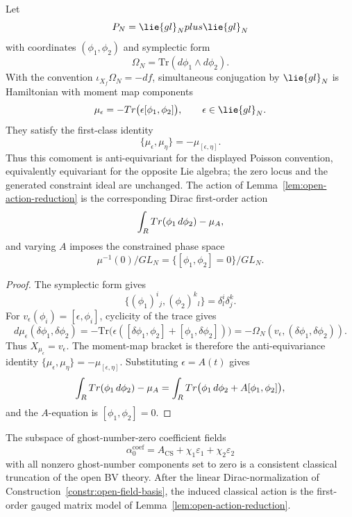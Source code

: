 \documentclass[11pt]{memoir}
\begin{document}
\begin{lem}\label{lem:dirac-probe-reduction}
  Let
  $$\mathcal P_N=\lie{gl}_N\oplus\lie{gl}_N$$
  with coordinates $(\phi_1,\phi_2)$ and symplectic form
  $$\Omega_N=\mathrm{Tr}(d\phi_1\wedge d\phi_2).$$
  With the convention $\iota_{X_f}\Omega_N=-df$, simultaneous conjugation by
  $\lie{gl}_N$ is Hamiltonian with moment map components
  $$\mu_\epsilon=-\mathrm{Tr}\bigl(\epsilon[\phi_1,\phi_2]\bigr),
    \qquad \epsilon\in\lie{gl}_N.$$
  They satisfy the first-class identity
  $$\{\mu_\epsilon,\mu_\eta\}=-\mu_{[\epsilon,\eta]}.$$
  Thus this comoment is anti-equivariant for the displayed Poisson
  convention, equivalently equivariant for the opposite Lie algebra; the
  zero locus and the generated constraint ideal are unchanged.
  The action of Lemma~\ref{lem:open-action-reduction} is the corresponding
  Dirac first-order action
  $$\int_{R} Tr(\phi_1\,d\phi_2)-\mu_A,$$
  and varying $A$ imposes the constrained phase space
  $$\mu^{-1}(0)/GL_N=\{[\phi_1,\phi_2]=0\}/GL_N.$$
\end{lem}

\begin{proof}
  The symplectic form gives
  $$\{(\phi_1)^i{}_j,(\phi_2)^k{}_l\}=\delta^i_l\delta^k_j.$$
  For $v_\epsilon(\phi_i)=[\epsilon,\phi_i]$, cyclicity of the trace gives
  $$d\mu_\epsilon(\delta\phi_1,\delta\phi_2)
    =-\mathrm{Tr}\bigl(\epsilon([\delta\phi_1,\phi_2]
      +[\phi_1,\delta\phi_2])\bigr)
    =-\Omega_N(v_\epsilon,(\delta\phi_1,\delta\phi_2)).$$
  Thus $X_{\mu_\epsilon}=v_\epsilon$. The moment-map bracket is therefore the
  anti-equivariance identity
  $\{\mu_\epsilon,\mu_\eta\}=-\mu_{[\epsilon,\eta]}$. Substituting
  $\epsilon=A(t)$ gives
  $$\int_{R}Tr(\phi_1\,d\phi_2)-\mu_A
    =\int_{R}Tr\bigl(\phi_1\,d\phi_2+A[\phi_1,\phi_2]\bigr),$$
  and the $A$-equation is $[\phi_1,\phi_2]=0$.
\end{proof}

\begin{prop}\label{prop:open-bv-truncation}
  The subspace of ghost-number-zero coefficient fields
  $$\alpha_0^{\mathrm{coef}}
    =A_{\mathrm{CS}}+\chi_1\varepsilon_1+\chi_2\varepsilon_2$$
  with all nonzero ghost-number components set to zero is a consistent
  classical truncation of the open BV theory. After the linear
  Dirac-normalization of Construction~\ref{constr:open-field-basis},
  the induced classical action is the first-order gauged matrix model of
  Lemma~\ref{lem:open-action-reduction}.
\end{prop}
\end{document}
